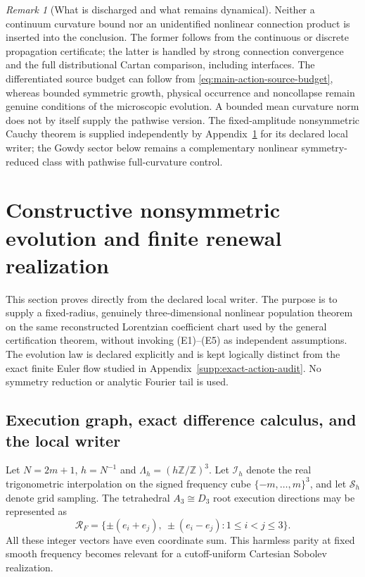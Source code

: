 \documentclass[11pt]{article}
\numberwithin{equation}{section}
\theoremstyle{definition}
\theoremstyle{remark}
\newtheorem{remark}[remark]{Remark}
\begin{document}
\begin{remark}[What is discharged and what remains dynamical]
Neither a continuum curvature bound nor an unidentified nonlinear connection
product is inserted into the conclusion.  The former follows from the
continuous or discrete propagation certificate; the latter is handled by
strong connection convergence and the full distributional Cartan comparison,
including interfaces.  The differentiated source budget can follow from
\eqref{eq:main-action-source-budget}, whereas bounded symmetric growth,
physical occurrence and noncollapse remain genuine conditions of the
microscopic evolution.  A bounded mean curvature norm does not by itself
supply the pathwise version.  The fixed-amplitude nonsymmetric Cauchy theorem
is supplied independently by Appendix~\ref{supp:open-3plus1} for its declared
local writer; the Gowdy sector below remains a complementary nonlinear
symmetry-reduced class with pathwise full-curvature control.
\end{remark}


\section{Constructive nonsymmetric evolution and finite renewal realization}
\label{supp:open-3plus1}

This section proves  directly from the declared
local writer.  The purpose is to supply a fixed-radius, genuinely
three-dimensional nonlinear population theorem on the same reconstructed
Lorentzian coefficient chart used by the general certification theorem,
without invoking \textup{(E1)--(E5)} as independent assumptions.  The
evolution law is declared explicitly and is kept logically distinct from the
exact finite Euler flow studied in Appendix~\ref{supp:exact-action-audit}.
No symmetry reduction or analytic Fourier tail is used.

\subsection{Execution graph, exact difference calculus, and the local writer}

Let $N=2m+1$, $h=N^{-1}$ and
$\Lambda_h=(h\mathbb Z/\mathbb Z)^3$.  Let $\mathcal I_h$ denote the real
trigonometric interpolation on the signed frequency cube
$\{-m,\ldots,m\}^3$, and let $\mathcal S_h$ denote grid sampling.  The
tetrahedral $A_3\cong D_3$ root
execution directions may be represented as
\begin{equation}
 \mathcal R_F=\{\pm(e_i+e_j),\ \pm(e_i-e_j):1\le i<j\le3\}.
 \label{eq:supp-open-fcc-roots}
\end{equation}
All these integer vectors have even coordinate sum.  This harmless parity at
fixed smooth frequency becomes relevant for a cutoff-uniform Cartesian
Sobolev realization.
\end{document}
